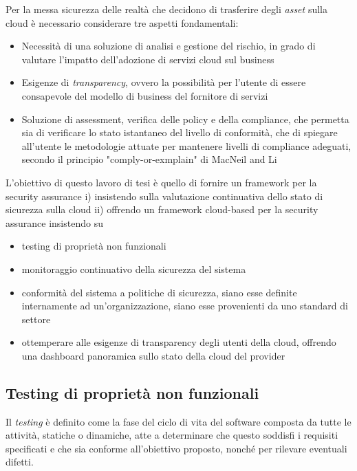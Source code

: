 \documentclass[../main.tex]{subfiles}
\begin{document}
Per la messa sicurezza delle realtà che decidono di trasferire degli \textit{asset} sulla cloud è necessario considerare tre aspetti fondamentali:
\begin{itemize}
    \item Necessità di una soluzione di analisi e gestione del rischio, in grado di valutare l'impatto dell'adozione di servizi cloud sul business
    \item Esigenze di \textit{transparency}, ovvero la possibilità per l'utente di essere consapevole del modello di business del fornitore di servizi 
    \item Soluzione di assessment, verifica delle policy e della compliance, che permetta sia di verificare lo stato istantaneo del livello di conformità, che di spiegare all'utente le metodologie attuate per mantenere livelli di compliance adeguati, secondo il principio "comply-or-exmplain" di MacNeil and Li\cite{RePEc:bla:corgov:v:14:y:2006:i:5:p:486-496}
\end{itemize}

L'obiettivo di questo lavoro di tesi è quello di fornire un framework per la security assurance i) insistendo sulla valutazione continuativa dello stato di sicurezza sulla cloud ii) offrendo un framework cloud-based per la security assurance insistendo su
\begin{itemize}
    \item testing di proprietà non funzionali
    \item monitoraggio continuativo della sicurezza del sistema
    \item conformità del sistema a politiche di sicurezza, siano esse definite internamente ad un'organizzazione, siano esse provenienti da uno standard di settore 
    \item ottemperare alle esigenze di transparency degli utenti della cloud, offrendo una dashboard panoramica sullo stato della cloud del provider
\end{itemize}

\subsection{Testing di proprietà non funzionali}

Il \textit{testing} è definito come la fase del ciclo di vita del software composta da tutte le attività, statiche o dinamiche, atte a determinare che questo soddisfi i requisiti specificati e che sia conforme all'obiettivo proposto, nonché per rilevare eventuali difetti.
\end{document}
